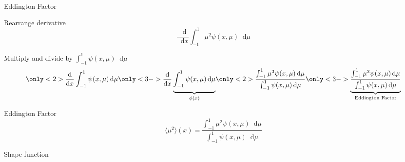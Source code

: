 \documentclass[10pt]{beamer}
\newcommand{\ud}{\mathop{}\!\mathrm{d}} %
\newcommand{\dderiv}[2]{\frac{\ud #1}{\ud #2}}
\newcommand{\edd}{\langle \mu^2 \rangle}
\begin{document}
\begin{frame}{Eddington Factor}

	Rearrange derivative 
	\begin{equation*}
		\dderiv{}{x} \int_{-1}^{1} \mu^2 \psi(x,\mu) \ud \mu
	\end{equation*}

	Multiply and divide by $\int_{-1}^{1} \psi(x,\mu) \ud \mu$
	\begin{equation*}
		\only<2>{\dderiv{}{x} \int_{-1}^{1} \psi(x,\mu) \ud \mu}
		\only<3->{\dderiv{}{x} \underbrace{\int_{-1}^{1} \psi(x,\mu) \ud \mu
			\vphantom{
				\frac{
					\int_{-1}^{1} \mu^2 \psi(x,\mu) \ud \mu
				}{
					\int_{-1}^{1} \psi(x,\mu) \ud \mu
				}
			}}_{
			\phi(x)
		}}
		\only<2>{
			\frac{
				\int_{-1}^{1} \mu^2 \psi(x,\mu) \ud \mu
			}{
				\int_{-1}^{1} \psi(x,\mu) \ud \mu
			}
		}
		\only<3->{\underbrace{\frac{
			\int_{-1}^{1} \mu^2 \psi(x,\mu) \ud \mu
		}{
			\int_{-1}^{1} \psi(x,\mu) \ud \mu
		}
		}_\text{Eddington Factor}
		}
		\vphantom{
			\underbrace{
			\frac{
				\int_{-1}^{1} \mu^2 \psi(x,\mu) \ud \mu
			}{
				\int_{-1}^{1} \psi(x,\mu) \ud \mu
			}
			}_{\edd(x)}
		}
	\end{equation*}

	Eddington Factor 
	\begin{equation*}
		\edd(x) = \frac{\int_{-1}^1 \mu^2 \psi(x,\mu) \ud \mu}{
			\int_{-1}^1 \psi(x,\mu) \ud \mu
		}
	\end{equation*}

	Shape function 

\end{frame}
\end{document}
